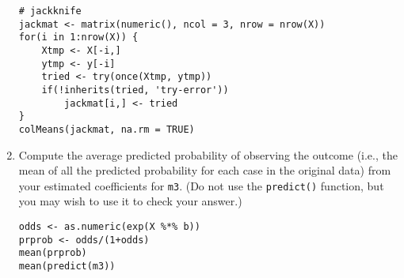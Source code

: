 \documentclass[a4paper,11pt]{article}
\begin{document}
\begin{enumerate}
\begin{solution}
\begin{lstlisting}
# jackknife
jackmat <- matrix(numeric(), ncol = 3, nrow = nrow(X))
for(i in 1:nrow(X)) {
    Xtmp <- X[-i,]
    ytmp <- y[-i]
    tried <- try(once(Xtmp, ytmp))
    if(!inherits(tried, 'try-error'))
        jackmat[i,] <- tried
}
colMeans(jackmat, na.rm = TRUE)
\end{lstlisting}
\end{solution}


\item Compute the average predicted probability of observing the outcome  (i.e., the mean of all the predicted probability for each case in the original data) from your estimated coefficients for \texttt{m3}. (Do not use the \texttt{predict()} function, but you may wish to use it to check your answer.)

\begin{solution}
\begin{lstlisting}
odds <- as.numeric(exp(X %*% b))
prprob <- odds/(1+odds)
mean(prprob)
mean(predict(m3))
\end{lstlisting}
\end{solution}


\end{enumerate}
\end{document}
